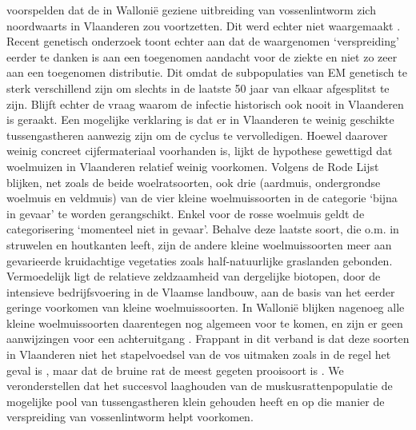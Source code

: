 \documentclass[twoside]{extreport}
\begin{document}
\citet{vervaeke2006spatial} voorspelden dat de in Wallonië geziene
uitbreiding van vossenlintworm zich noordwaarts in Vlaanderen zou
voortzetten. Dit werd echter niet waargemaakt
\citep[\citet{vervaeke2014geen},
\citet{vervaeke2014bis}]{vervaeke2012vossenlintworm}. Recent genetisch
onderzoek \citep{knapp2009genetic} toont echter aan dat de waargenomen
`verspreiding' eerder te danken is aan een toegenomen aandacht voor de
ziekte en niet zo zeer aan een toegenomen distributie. Dit omdat de
subpopulaties van EM genetisch te sterk verschillend zijn om slechts in
de laatste 50 jaar van elkaar afgesplitst te zijn. Blijft echter de
vraag waarom de infectie historisch ook nooit in Vlaanderen is geraakt.
Een mogelijke verklaring is dat er in Vlaanderen te weinig geschikte
tussengastheren aanwezig zijn om de cyclus te vervolledigen. Hoewel
daarover weinig concreet cijfermateriaal voorhanden is, lijkt de
hypothese gewettigd dat woelmuizen in Vlaanderen relatief weinig
voorkomen. Volgens de Rode Lijst \citep{maes2014iucn} blijken, net zoals
de beide woelratsoorten, ook drie (aardmuis, ondergrondse woelmuis en
veldmuis) van de vier kleine woelmuissoorten in de categorie `bijna in
gevaar' te worden gerangschikt. Enkel voor de rosse woelmuis geldt de
categorisering `momenteel niet in gevaar'. Behalve deze laatste soort,
die o.m. in struwelen en houtkanten leeft, zijn de andere kleine
woelmuissoorten meer aan gevarieerde kruidachtige vegetaties zoals
half-natuurlijke graslanden gebonden. Vermoedelijk ligt de relatieve
zeldzaamheid van dergelijke biotopen, door de intensieve bedrijfsvoering
in de Vlaamse landbouw, aan de basis van het eerder geringe voorkomen
van kleine woelmuissoorten. In Wallonië blijken nagenoeg alle kleine
woelmuissoorten daarentegen nog algemeen voor te komen, en zijn er geen
aanwijzingen voor een achteruitgang \citep{libois2006erosion}. Frappant
in dit verband is dat deze soorten in Vlaanderen niet het stapelvoedsel
van de vos uitmaken zoals in de regel het geval is \citep{lloyd1980red},
maar dat de bruine rat de meest gegeten prooisoort is
\citep{van2010no, keune2013science}. We veronderstellen dat het
succesvol laaghouden van de muskusrattenpopulatie de mogelijke pool van
tussengastheren klein gehouden heeft en op die manier de verspreiding
van vossenlintworm helpt voorkomen.
\end{document}
